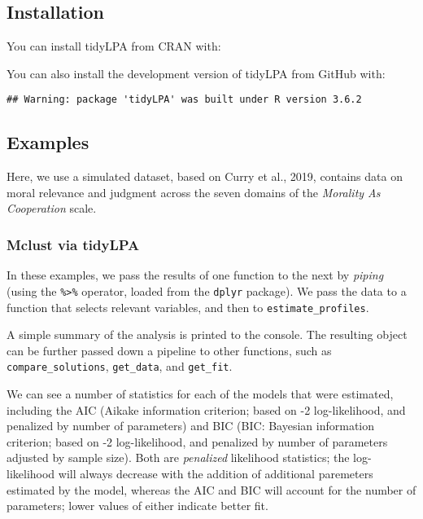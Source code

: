 \documentclass[man]{apa6}
\begin{document}
\hypertarget{installation}{%
\subsection{Installation}\label{installation}}

You can install tidyLPA from CRAN with:

You can also install the development version of tidyLPA from GitHub with:

\begin{verbatim}
## Warning: package 'tidyLPA' was built under R version 3.6.2
\end{verbatim}

\hypertarget{examples}{%
\subsection{Examples}\label{examples}}

Here, we use a simulated dataset, based on Curry et al., 2019, contains data on moral relevance and judgment across the seven domains of the \emph{Morality As Cooperation} scale.

\hypertarget{mclust-via-tidylpa}{%
\subsubsection{Mclust via tidyLPA}\label{mclust-via-tidylpa}}

In these examples, we pass the results of one function to the next by \emph{piping}
(using the \texttt{\%\textgreater{}\%} operator, loaded from the \texttt{dplyr} package). We pass the data to
a function that selects relevant variables, and then to \texttt{estimate\_profiles}.

A simple summary of the analysis is printed to the console.
The resulting object can be further passed down a pipeline to
other functions, such as \texttt{compare\_solutions}, \texttt{get\_data}, and \texttt{get\_fit}.

We can see a number of statistics for each of the models that were estimated, including the
AIC (Aikake information criterion; based on -2 log-likelihood, and penalized by number of parameters) and BIC (BIC: Bayesian information criterion; based on -2 log-likelihood, and penalized by number of parameters adjusted by sample size). Both are \emph{penalized} likelihood statistics; the log-likelihood will always decrease with the addition of additional
paremeters estimated by the model, whereas the AIC and BIC will account for the number of parameters; lower values of
either indicate better fit.
\end{document}
